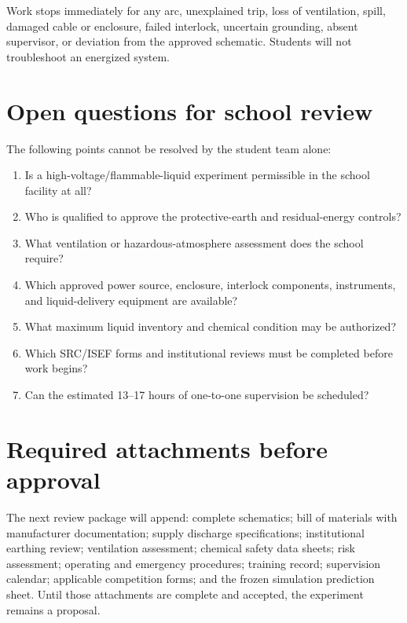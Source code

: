 \documentclass[11pt]{article}
\begin{document}
Work stops immediately for any arc, unexplained trip, loss of ventilation, spill, damaged cable or enclosure, failed interlock, uncertain grounding, absent supervisor, or deviation from the approved schematic. Students will not troubleshoot an energized system.

\section{Open questions for school review}

The following points cannot be resolved by the student team alone:
\begin{enumerate}
    \item Is a high-voltage/flammable-liquid experiment permissible in the school facility at all?
    \item Who is qualified to approve the protective-earth and residual-energy controls?
    \item What ventilation or hazardous-atmosphere assessment does the school require?
    \item Which approved power source, enclosure, interlock components, instruments, and liquid-delivery equipment are available?
    \item What maximum liquid inventory and chemical condition may be authorized?
    \item Which SRC/ISEF forms and institutional reviews must be completed before work begins?
    \item Can the estimated 13--17 hours of one-to-one supervision be scheduled?
\end{enumerate}

\section{Required attachments before approval}

The next review package will append: complete schematics; bill of materials with manufacturer documentation; supply discharge specifications; institutional earthing review; ventilation assessment; chemical safety data sheets; risk assessment; operating and emergency procedures; training record; supervision calendar; applicable competition forms; and the frozen simulation prediction sheet. Until those attachments are complete and accepted, the experiment remains a proposal.



\end{document}
